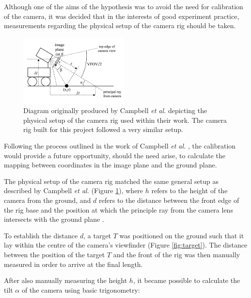 Although one of the aims of the hypothesis was to avoid the need for calibration of the camera, it was decided that in the interests of good experiment practice, measurements regarding the physical setup of the camera rig should be taken. 

\begin{figure}
\vspace{-20pt}
  \begin{center}
    \includegraphics[width=0.49\textwidth]{images/cam_setup.png}
  \end{center}
  \vspace{-10pt}
  \caption{Diagram originally produced by Campbell \textit{et al.} \cite{campbell} depicting the physical setup of the camera rig used within their work. The camera rig built for this project followed a very similar setup.}
  \label{fig:setup}
  \vspace{2pt}
\end{figure}

Following the process outlined in the work of Campbell \textit{et al.} \cite{campbell}, the calibration would provide a future opportunity, should the need arise, to calculate the mapping between coordinates in the image plane and the ground plane.

The physical setup of the camera rig matched the same general setup as described by Campbell \textit{et al.} \cite{campbell} (Figure \ref{fig:setup}), where $h$ refers to the height of the camera from the ground, and $d$ refers to the distance between the front edge of the rig base and the position at which the principle ray from the camera lens intersects with the ground plane \cite{campbell}.

To establish the distance $d$, a target $T$ was positioned on the ground such that it lay within the centre of the camera's viewfinder (Figure \ref{fig:target}). The distance between the position of the target $T$ and the front of the rig was then manually measured in order to arrive at the final length. 

After also manually measuring the height $h$, it became possible to calculate the tilt $ \alpha $ of the camera using basic trigonometry:

